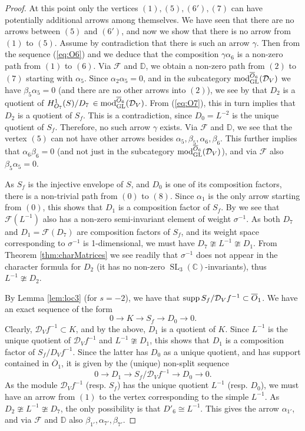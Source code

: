 \documentclass[11pt,reqno]{amsart}
\renewcommand{\a}{\alpha}
\renewcommand{\b}{\beta}
\newcommand{\D}{\mathcal{D}}
\newcommand{\tn}{\textnormal}
\newcommand{\C}{\mathbb{C}}
\newcommand{\GL}{\operatorname{GL}}
\newcommand{\SL}{\operatorname{SL}}
\newcommand{\bb}[1]{\mathbb{#1}}
\newcommand{\mc}[1]{\mathcal{#1}}
\newcommand{\ol}[1]{\overline{#1}}
\numberwithin{equation}{section}
\begin{document}
\begin{proof}
At this point only the vertices $(1), (5), (6'), (7)$ can have potentially additional arrows among themselves. We have seen that there are no arrows between $(5)$ and $(6')$, and now we show that there is no arrow from $(1)$ to $(5)$. Assume by contradiction that there is such an arrow $\gamma$. Then from the sequence (\ref{eq:O6}) and \cite[Lemma 3.11]{lHorincz2019categories} we deduce that the composition $\gamma \a_6$ is a non-zero path from $(1)$ to $(6)$. Via $\mc{F}$ and $\mathbb{D}$, we obtain a non-zero path from $(2)$ to $(7)$ starting with $\a_5$. Since $\a_2 \a_5 =0$, and in the subcategory $\tn{mod}_{\GL}^{\ol{O}_6}(\D_V)$ we have $\b_5 \a_5 =0 $ (and there are no other arrows into $(2)$), we see by \cite[Lemma 3.11]{lHorincz2019categories} that $D_2$ is a quotient of $H^1_{O_7}(S)/D_7 \, \in \tn{mod}_{\GL}^{\ol{O}_6}(\D_V)$. From (\ref{eq:O7}), this in turn implies that $D_2$ is a quotient of $S_f$. This is a contradiction, since $D_0=L^{-2}$ is the unique quotient of $S_f$. Therefore, no such arrow $\gamma$ exists. Via $\mc{F}$ and $\mathbb{D}$, we see that the vertex $(5)$ can not have other arrows besides $\a_5,\b_5,\a_6,\b_6$. This further implies that $\a_6\b_6=0$ (and not just in the subcategory $\tn{mod}_{\GL}^{\ol{O}_6}(\D_V)$), and via $\mc{F}$ also $\b_5\a_5=0$.


As $S_f$ is the injective envelope of $S$, and $D_0$ is one of its composition factors, there is a non-trivial path from $(0)$ to $(8)$. Since $\a_1$ is the only arrow starting from $(0)$, this shows that $D_1$ is a composition factor of $S_f$. By  \cite[Equation 4.14]{lHorincz2019categories} we see that $\mc{F}(L^{-1})$ also has a non-zero semi-invariant element of weight $\sigma^{-1}$. As both $D_7$ and $D_1 = \mc{F}(D_7)$ are composition factors of $S_f$, and its weight space corresponding to $\sigma^{-1}$ is 1-dimensional, we must have $D_7 \ncong L^{-1} \ncong D_1$. From Theorem \ref{thm:charMatrices} we see readily that $\sigma^{-1}$ does not appear in the character formula for $D_2$ (it has no non-zero $\SL_3(\C)$-invariants), thus $L^{-1} \ncong D_2$. 

By Lemma \ref{lem:loc3} (for $s=-2$), we have that $\tn{supp} \, S_f/\D_Vf^{-1} \subset \ol{O}_1$. We have an exact sequence of the form
\[ 0 \to K \to S_f \to D_0 \to 0.\]
Clearly, $\D_V f^{-1} \subset K$, and by the above, $D_1$ is a quotient of $K$. Since $L^{-1}$ is the unique quotient of $\D_V f^{-1}$ and $L^{-1} \ncong D_1$, this shows that $D_1$ is a composition factor of $S_f / D_V f^{-1}$. Since the latter has $D_0$ as a unique quotient, and has support contained in $\ol{O}_1$, it is given by the (unique) non-split sequence 
\[ 0 \to D_1 \to S_f / \D_V f^{-1} \to D_0 \to 0.\]
As the module $\D_V f^{-1}$ (resp. $S_f$) has the unique quotient $L^{-1}$ (resp. $D_0$), we must have an arrow from $(1)$ to the vertex corresponding to the simple $L^{-1}$. As $D_2 \ncong L^{-1} \ncong D_7$, the only possibility is that $D'_6 \cong L^{-1}$. This gives the arrow $\a_{1'}$, and via $\mc{F}$ and $\bb{D}$ also $\b_{1'}, \a_{7'}, \b_{7'}$.


\end{proof}
\end{document}
